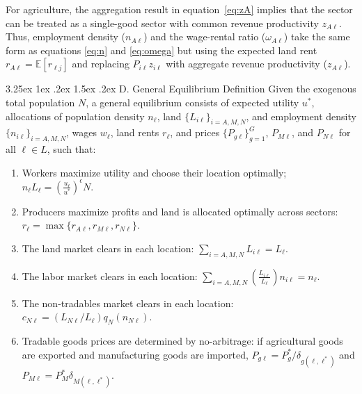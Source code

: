 \documentclass[11pt]{article}
\makeatletter
\renewcommand\paragraph{\@startsection{paragraph}{4}{\z@}%
  {3.25ex \@plus 1ex \@minus .2ex}%
  {1.5ex \@plus .2ex}%
  {\normalfont\normalsize\bfseries}}
\makeatother
\begin{document}
For agriculture, the aggregation result in equation~\eqref{eq:zA} implies
that the sector can be treated as a single-good sector with common
revenue productivity $z_{A\ell}$. Thus, employment density ($n_{A\ell}$) and the wage-rental ratio ($\omega_{A\ell}$) take the same form as equations \eqref{eq:n} and \eqref{eq:omega} but using the expected land rent $r_{A\ell}=\mathbb{E}[r_{\ell j}]$ and replacing $P_{i\ell}z_{i\ell}$ with aggregate revenue productivity ($z_{A\ell}$).

\paragraph{D. General Equilibrium Definition}
Given the exogenous total population $N$, a general equilibrium consists of expected utility $u^\ast$, allocations of population density $n_\ell$, land $\{L_{i\ell}\}_{i=A,M,N}$, and employment density $\{n_{i\ell}\}_{i=A,M,N}$, wages $w_\ell$, land rents $r_\ell$, and prices $\{P_{g\ell}\}_{g=1}^{G}$, $P_{M\ell}$, and $P_{N\ell}$ for all
$\ell \in L$, such that:
\begin{enumerate}[label=\roman*.]
    \item Workers maximize utility and choose their location optimally; $n_\ell L_\ell = \left(\frac{u_\ell}{u^*}\right)^\epsilon N$.
    \item Producers maximize profits and land is allocated optimally across sectors: $r_{\ell} = \max\{r_{A\ell}, r_{M\ell}, r_{N\ell}\}$.
    \item The land market clears in each location: $\sum_{i=A, M, N} L_{i\ell} = L_{\ell}$.
    \item The labor market clears in each location: $\sum_{i=A, M,  N} \left(\frac{L_{i\ell}}{L_{\ell}}\right) n_{i\ell} = n_{\ell}$.
    \item The non-tradables market clears in each location: $c_{N\ell} = (L_{N\ell}/L_{\ell}) q_{N} (n_{N\ell})$.
    \item Tradable goods prices are determined by no-arbitrage: if agricultural goods are exported and manufacturing goods are imported, $ P_{g\ell} = P_g^\ast / \delta_{g(\ell, \ell^\ast)}$ and $P_{M\ell} = P_M^\ast \delta_{M(\ell, \ell^\ast)}$.
\end{enumerate}
\end{document}
